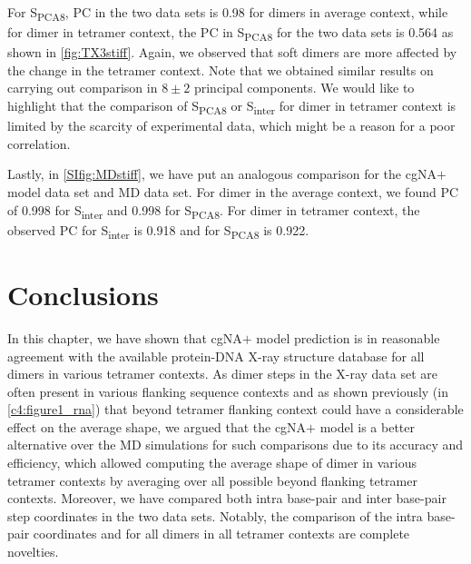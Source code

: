 For S\textsubscript{PCA8}, PC in the two data sets is 0.98 for dimers in average context, while for dimer in tetramer context, the PC in S\textsubscript{PCA8} for the two data sets is 0.564 as shown in \cref{fig:TX3stiff}. 
Again, we observed that soft dimers are more affected by the change in the tetramer context. 
Note that we obtained similar results on carrying out comparison in $8 \pm 2$ principal components.
We would like to highlight that the comparison of S\textsubscript{PCA8} or S\textsubscript{inter} for dimer in tetramer context is limited by the scarcity of experimental data, which might be a reason for a poor correlation.

Lastly, in \cref{SIfig:MDstiff}, we have put an analogous comparison for the cgNA$+$ model data set and MD data set. For dimer in the average context, we found PC of 0.998 for S\textsubscript{inter} and 0.998 for S\textsubscript{PCA8}. 
For dimer in tetramer context, the observed PC for S\textsubscript{inter} is 0.918 and for S\textsubscript{PCA8} is 0.922. 

\section{Conclusions}
In this chapter, we have shown that cgNA$+$ model prediction is in reasonable agreement with the available protein-DNA X-ray structure database for all dimers in various tetramer contexts.
As dimer steps in the X-ray data set are often present in various flanking sequence contexts and as shown previously (in \cref{c4:figure1_rna}) that beyond tetramer flanking context could have a considerable effect on the average shape, we argued that the cgNA$+$ model is a better alternative over the MD simulations for such comparisons due to its accuracy and efficiency, which allowed computing the average shape of dimer in various tetramer contexts by averaging over all possible beyond flanking tetramer contexts.
Moreover, we have compared both intra base-pair and inter base-pair step coordinates in the two data sets. 
Notably, the comparison of the intra base-pair coordinates and for all dimers in all tetramer contexts are complete novelties.

